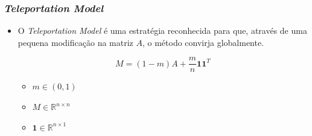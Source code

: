 \documentclass{beamer}
\begin{document}
\begin{frame}
	\frametitle{\textit{Teleportation Model}}

\begin{itemize}	
	\item O \textit{Teleportation Model} \'e uma estrat\'egia reconhecida para que, atrav\'es de uma pequena modifica\c{c}\~ao na matriz $A$, o m\'etodo convirja globalmente.
	
\begin{equation}
	M = (1-m)A + \frac{m}{n} \textbf{11}^T
\end{equation}
 
	\begin{itemize}
	\item $m \in (0,1)$
	\item $M \in \mathbb{R}^{n \times n}$
	\item $\textbf{1} \in \mathbb{R}^{n \times 1}$
	\end{itemize}
\end{itemize}		
	
\end{frame}
\end{document}
